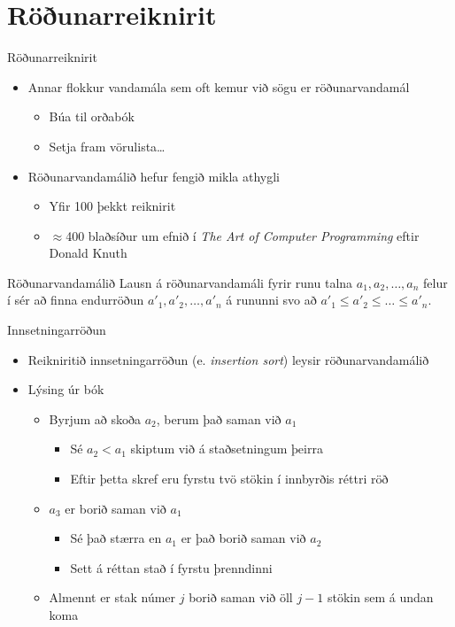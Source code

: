 \documentclass[handout]{beamer}
\begin{document}
\section{Röðunarreiknirit}

\begin{frame}{Röðunarreiknirit}
\begin{itemize}
 \item Annar flokkur vandamála sem oft kemur við sögu er röðunarvandamál
 \begin{itemize}
  \item Búa til orðabók
  \item Setja fram vörulista\ldots
 \end{itemize}
 \item Röðunarvandamálið hefur fengið mikla athygli
 \begin{itemize}
  \item Yfir 100 þekkt reiknirit
  \item $\approx$400 blaðsíður um efnið í \emph{The Art of Computer Programming} eftir Donald Knuth
 \end{itemize}
\end{itemize}
\end{frame}

\begin{frame}{Röðunarvandamálið}
Lausn á röðunarvandamáli fyrir runu talna $a_1, a_2, \ldots, a_n$ felur í sér að finna endurröðun $a'_1, a'_2, \ldots, a'_n$ á rununni svo að $a'_1 \leq a'_2 \leq \ldots \leq a'_n$.
\end{frame}


\begin{frame}{Innsetningarröðun}
\begin{itemize}
 \item Reikniritið innsetningarröðun (e. \emph{insertion sort}) leysir röðunarvandamálið
 \item Lýsing úr bók
 \begin{itemize}
  \item Byrjum að skoða $a_2$, berum það saman við $a_1$
  \begin{itemize}
   \item Sé $a_2 < a_1$ skiptum við á staðsetningum þeirra
   \item Eftir þetta skref eru fyrstu tvö stökin í innbyrðis réttri röð
  \end{itemize}
  \item $a_3$ er borið saman við $a_1$
  \begin{itemize}
   \item Sé það stærra en $a_1$ er það borið saman við $a_2$
   \item Sett á réttan stað í fyrstu þrenndinni
  \end{itemize}
  \item Almennt er stak númer $j$ borið saman við öll $j-1$ stökin sem á undan koma
 \end{itemize}
\end{itemize}
\end{frame}
\end{document}
